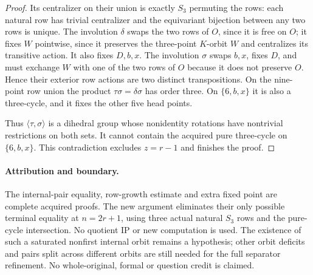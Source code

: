 \documentclass[11pt,a4paper]{article}
\newcommand{\gen}[1]{\langle#1\rangle}
\begin{document}
\begin{proof}
Its centralizer on their union is exactly $S_3$ permuting
the rows: each natural row has trivial centralizer and the
equivariant bijection between any two rows is unique.
The involution $\delta$ swaps the two rows of $O$, since
it is free on $O$; it fixes $W$ pointwise, since it preserves
the three-point $K$-orbit $W$ and centralizes its transitive
action. It also fixes $D,b,x$.
The involution $\sigma$ swaps $b,x$, fixes $D$, and must
exchange $W$ with one of the two rows of $O$ because it
does not preserve $O$. Hence their exterior row actions
are two distinct transpositions. On the nine-point row
union the product $\tau\sigma=\delta\sigma$ has order
three. On $\{6,b,x\}$ it is also a three-cycle, and
it fixes the other five head points.

Thus $\gen{\tau,\sigma}$ is a dihedral group whose
nonidentity rotations have nontrivial restrictions on both
sets. It cannot contain the acquired pure three-cycle on
$\{6,b,x\}$. This contradiction excludes $z=r-1$ and
finishes the proof.
\end{proof}

\paragraph{Attribution and boundary.}
The internal-pair equality, row-growth estimate and extra fixed
point are complete acquired proofs. The new argument eliminates
their only possible terminal equality at $n=2r+1$, using three
actual natural $S_3$ rows and the pure-cycle intersection.
No quotient IP or new computation is used. The existence of
such a saturated nonfirst internal orbit remains a hypothesis;
other orbit deficits and pairs split across different orbits
are still needed for the full separator refinement. No
whole-original, formal or question credit is claimed.
\end{document}
